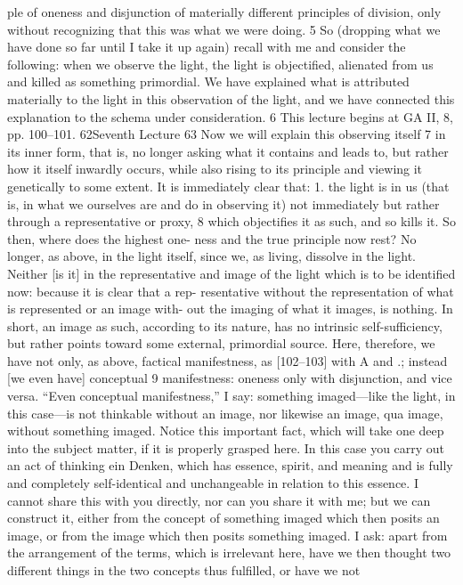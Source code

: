 ple of oneness and disjunction of materially different principles of division,
only without recognizing that this was what we were doing. 5
So (dropping what we have done so far until I take it up again) recall
with me and consider the following: when we observe the light, the light is
objectified, alienated from us and killed as something primordial. We have
explained what is attributed materially to the light in this observation of the
light, and we have connected this explanation to the schema under consideration. 6
This lecture begins at GA II, 8, pp. 100–101.
62Seventh Lecture
63
Now we will explain this observing itself 7 in its inner form, that is, no longer
asking what it contains and leads to, but rather how it itself inwardly occurs,
while also rising to its principle and viewing it genetically to some extent. It is
immediately clear that: 1. the light is in us (that is, in what we ourselves are and
do in observing it) not immediately but rather through a representative or proxy, 8
which objectifies it as such, and so kills it. So then, where does the highest one-
ness and the true principle now rest? No longer, as above, in the light itself,
since we, as living, dissolve in the light. Neither [is it] in the representative and
image of the light which is to be identified now: because it is clear that a rep-
resentative without the representation of what is represented or an image with-
out the imaging of what it images, is nothing. In short, an image as such,
according to its nature, has no intrinsic self-sufficiency, but rather points
toward some external, primordial source. Here, therefore, we have not only, as
above, factical manifestness, as [102–103] with A and .; instead [we even have]
conceptual 9 manifestness: oneness only with disjunction, and vice versa. “Even
conceptual manifestness,” I say: something imaged—like the light, in this
case—is not thinkable without an image, nor likewise an image, qua image,
without something imaged. Notice this important fact, which will take one
deep into the subject matter, if it is properly grasped here. In this case you carry
out an act of thinking {ein Denken}, which has essence, spirit, and meaning and
is fully and completely self-identical and unchangeable in relation to this
essence. I cannot share this with you directly, nor can you share it with me; but
we can construct it, either from the concept of something imaged which then
posits an image, or from the image which then posits something imaged. I ask:
apart from the arrangement of the terms, which is irrelevant here, have we then
thought two different things in the two concepts thus fulfilled, or have we not
